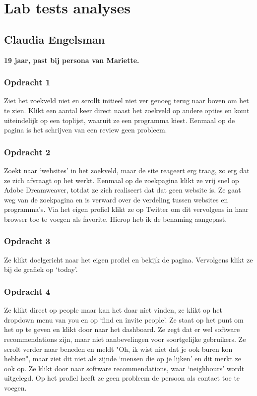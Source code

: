 \chapter{Lab tests analyses}
    \label{labtestsappendix}

\section{Claudia Engelsman}
\textbf{19 jaar, past bij persona van Mariette.}

\subsection{Opdracht 1}
  Ziet het zoekveld niet en scrollt initieel niet ver genoeg terug naar boven om het te zien. Klikt een aantal keer direct naast het zoekveld op andere opties en komt uiteindelijk op een toplijst, waaruit ze een programma kiest. Eenmaal op de pagina is het schrijven van een review geen probleem.

\subsection{Opdracht 2}
  Zoekt naar `websites' in het zoekveld, maar de site reageert erg traag, zo erg dat ze zich afvraagt op het werkt. Eenmaal op de zoekpagina klikt ze vrij snel op Adobe Dreamweaver, totdat ze zich realiseert dat dat geen website is. Ze gaat weg van de zoekpagina en is verward over de verdeling tussen websites en programma's. Via het eigen profiel klikt ze op Twitter om dit vervolgens in haar browser toe te voegen als favorite. Hierop heb ik de benaming aangepast.

\subsection{Opdracht 3}
  Ze klikt doelgericht naar het eigen profiel en bekijk de pagina. Vervolgens klikt ze bij de grafiek op `today'.

\subsection{Opdracht 4}
 Ze klikt direct op people maar kan het daar niet vinden, ze klikt op het dropdown menu van you en op `find en invite people'. Ze staat op het punt om het op te geven en klikt door naar het dashboard. Ze zegt dat er wel software recommendations zijn, maar niet aanbevelingen voor soortgelijke gebruikers. Ze scrolt verder naar beneden en meldt "Oh, ik wist niet dat je ook buren kon hebben", maar ziet dit niet als zijnde `mensen die op je lijken' en dit merkt ze ook op. Ze klikt door naar software recommendations, waar `neighbours' wordt uitgelegd. Op het profiel heeft ze geen probleem de persoon als contact toe te voegen.

